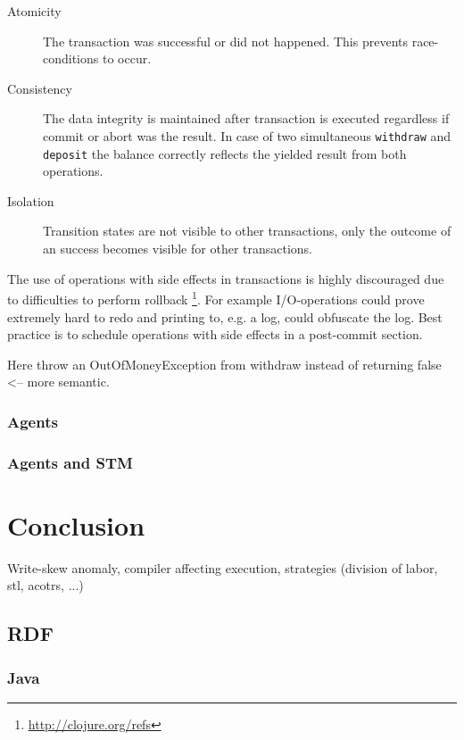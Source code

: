 \documentclass[a4paper,12pt]{kth-mag}
\begin{document}
\begin{description}
    \item[Atomicity] The transaction was successful or did not happened. This prevents race-conditions to occur.
    \item[Consistency] The data integrity is maintained after transaction is executed regardless if commit or abort was the result. In case of two simultaneous \texttt{withdraw} and \texttt{deposit} the balance correctly reflects the yielded result from both operations.
    \item[Isolation] Transition states are not visible to other transactions, only the outcome of an success becomes visible for other transactions.
\end{description}

The use of operations with side effects in transactions is highly discouraged due to difficulties to perform rollback \footnote{\url{http://clojure.org/refs}}. For example I/O-operations could prove extremely hard to redo and printing to, e.g. a log, could obfuscate the log. Best practice is to schedule operations with side effects in a post-commit section.

Here throw an OutOfMoneyException from withdraw instead of returning false <-- more semantic.

\section{Agents}
\section{Agents and STM}

\part{Conclusion}
Write-skew anomaly, compiler affecting execution, strategies (division of labor, stl, acotrs, ...)

\appendix
\addappheadtotoc
\chapter{RDF}\label{appA}

\section{Java}
\end{document}
